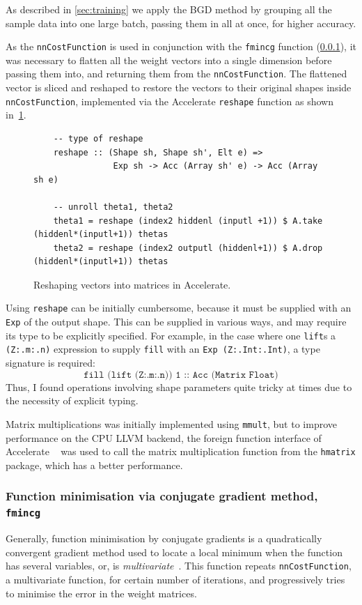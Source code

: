As described in \ref{sec:training} we apply the BGD method by grouping all the sample data into one large batch, passing them in all at once, for higher accuracy. 

As the \texttt{nnCostFunction} is used in conjunction with the \texttt{fmincg} function (\ref{se:impl.fmincg}), it was necessary to flatten all the weight vectors into a single dimension before passing them into, and returning them from the \texttt{nnCostFunction}. The flattened vector is sliced and reshaped to restore the vectors to their original shapes inside \texttt{nnCostFunction}, implemented via the Accelerate \texttt{reshape} function as shown in~\ref{fig:reshape}.

\begin{figure}
	\begin{lstlisting}
	-- type of reshape
    reshape :: (Shape sh, Shape sh', Elt e) =>
                Exp sh -> Acc (Array sh' e) -> Acc (Array sh e)

    -- unroll theta1, theta2
    theta1 = reshape (index2 hiddenl (inputl +1)) $ A.take (hiddenl*(inputl+1)) thetas
    theta2 = reshape (index2 outputl (hiddenl+1)) $ A.drop (hiddenl*(inputl+1)) thetas
	\end{lstlisting}
  	\caption{Reshaping vectors into matrices in Accelerate.}
	\label{fig:reshape}
\end{figure}

Using \texttt{reshape} can be initially cumbersome, because it must be supplied with an \texttt{Exp} of the output shape. This can be supplied in various ways, and may require its type to be explicitly specified. For example, in the case where one \texttt{lift}s a \texttt{(Z:.m:.n)} expression to supply \texttt{fill} with an \texttt{Exp (Z:.Int:.Int)}, a type signature is required:
$$\texttt{fill (lift (Z:.m:.n)) 1 :: Acc (Matrix Float)}$$
Thus, I found operations involving shape parameters quite tricky at times due to the necessity of explicit typing.

Matrix multiplications was initially implemented using \texttt{mmult}, but to improve performance on the CPU LLVM backend, the foreign function interface of Accelerate ~\cite{Eve16} was used to call the matrix multiplication function from the \texttt{hmatrix} package, which has a better performance. 

\subsubsection{Function minimisation via conjugate gradient method, \texttt{fmincg}} \label{se:impl.fmincg}
Generally, function minimisation by conjugate gradients is a quadratically convergent gradient method used to locate a local minimum when the function has several variables, or, is \textit{multivariate}~\cite{FleRee}. This function repeats \texttt{nnCostFunction}, a multivariate function, for certain number of iterations, and progressively tries to minimise the error in the weight matrices.

